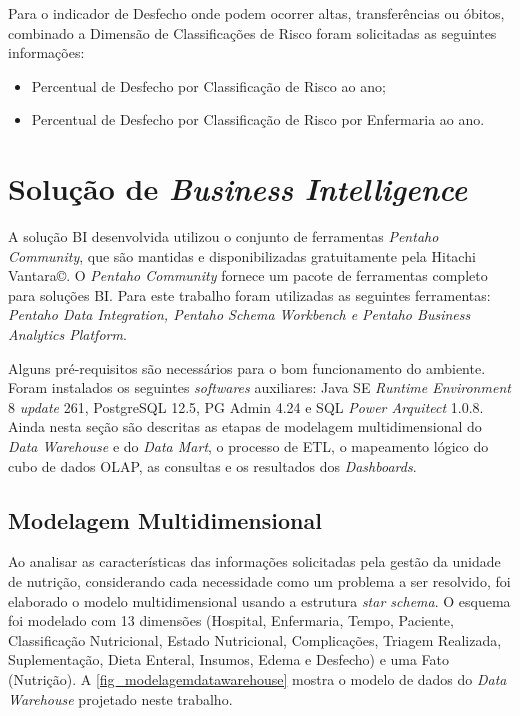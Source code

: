 Para o indicador de Desfecho onde podem ocorrer altas, transferências ou óbitos, combinado a Dimensão de Classificações de Risco foram solicitadas as seguintes informações:
\begin{itemize}
    \item Percentual de Desfecho por Classificação de Risco ao ano;
    \item Percentual de Desfecho por Classificação de Risco por Enfermaria ao ano.
\end{itemize}

\section{Solução de \textit{Business Intelligence}}

A solução BI desenvolvida utilizou o conjunto de ferramentas \textit{Pentaho Community}, que são mantidas e disponibilizadas gratuitamente pela Hitachi Vantara©. O \textit{Pentaho Community} fornece um pacote de ferramentas completo para soluções BI. Para este trabalho foram utilizadas as seguintes ferramentas: \textit{Pentaho Data Integration, Pentaho Schema Workbench e Pentaho Business Analytics Platform}.

Alguns pré-requisitos são necessários para o bom funcionamento do ambiente. Foram instalados os seguintes \textit{softwares} auxiliares: Java SE \textit{Runtime Environment} 8 \textit{update} 261, PostgreSQL 12.5, PG Admin 4.24 e SQL \textit{Power Arquitect} 1.0.8. Ainda nesta seção são descritas as etapas de modelagem multidimensional do \textit{Data Warehouse} e do \textit{Data Mart}, o processo de ETL, o mapeamento lógico do cubo de dados OLAP, as consultas e os resultados dos \textit{Dashboards}.

\subsection{Modelagem Multidimensional}
Ao analisar as características das informações solicitadas pela gestão da unidade de nutrição, considerando cada necessidade como um problema a ser resolvido, foi elaborado o modelo multidimensional usando a estrutura \textit{star schema}. O esquema foi modelado com 13 dimensões (Hospital, Enfermaria, Tempo, Paciente, Classificação Nutricional, Estado Nutricional, Complicações, Triagem Realizada, Suplementação, Dieta Enteral, Insumos, Edema e Desfecho) e uma Fato (Nutrição). A \autoref{fig_modelagemdatawarehouse} mostra o modelo de dados do \textit{Data Warehouse} projetado neste trabalho.

